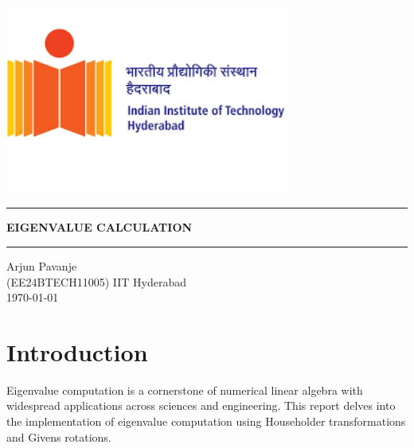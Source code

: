 \documentclass[12pt]{article}
\begin{document}
\begin{titlepage}                                             
\pagestyle{empty}                                             
\centering                                                   
\includegraphics[width=0.7\textwidth]{IITH.png} \\ 
\vspace{60mm}                                                 
\hrule\vspace{5mm}                                           
{\LARGE \textbf{{EIGENVALUE CALCULATION}}} \\          
\vspace{5mm}\hrule\vspace{20mm}                        
{\large Arjun Pavanje} \\ \vspace{2mm}                           
{\large (EE24BTECH11005)}                        
\vfill                                                       
{\small IIT Hyderabad\\ \today}               
\cleardoublepage                                            
\end{titlepage}

\section{Introduction}


Eigenvalue computation is a cornerstone of numerical linear algebra with widespread applications across sciences and engineering. This report delves into the implementation of eigenvalue computation using Householder transformations and Givens rotations. 
\end{document}
